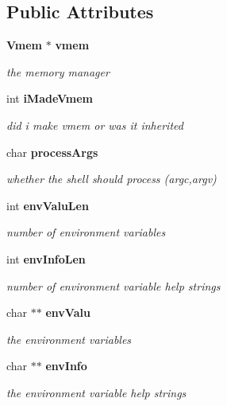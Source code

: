 \subsection*{Public Attributes}
\begin{DoxyCompactItemize}
\item 
{\bf Vmem} $\ast$ {\bf vmem}
\begin{DoxyCompactList}\small\item\em the memory manager \item\end{DoxyCompactList}\item 
int {\bf iMadeVmem}
\begin{DoxyCompactList}\small\item\em did i make vmem or was it inherited \item\end{DoxyCompactList}\item 
char {\bf processArgs}
\begin{DoxyCompactList}\small\item\em whether the shell should process (argc,argv) \item\end{DoxyCompactList}\item 
int {\bf envValuLen}
\begin{DoxyCompactList}\small\item\em number of environment variables \item\end{DoxyCompactList}\item 
int {\bf envInfoLen}
\begin{DoxyCompactList}\small\item\em number of environment variable help strings \item\end{DoxyCompactList}\item 
char $\ast$$\ast$ {\bf envValu}
\begin{DoxyCompactList}\small\item\em the environment variables \item\end{DoxyCompactList}\item 
char $\ast$$\ast$ {\bf envInfo}
\begin{DoxyCompactList}\small\item\em the environment variable help strings \item\end{DoxyCompactList}\item 

\end{DoxyCompactItemize}
